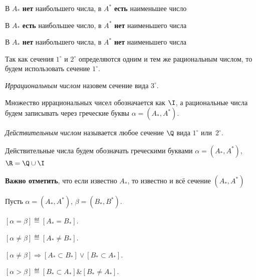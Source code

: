 \begin{properties}
\item В \(A_*\) \textbf{нет} наибольшего числа, в \(A^*\) \textbf{есть} наименьшее число
\item В \(A_*\) \textbf{есть} наибольшее число, в \(A^*\) \textbf{нет} наименьшего числа
\item В \(A_*\) \textbf{нет} наибольшего числа, в \(A^*\) \textbf{нет} наименьшего числа
\end{properties}

Так как сечения \(1^\circ\) и \(2^\circ\) определяются одним и тем же рациональным числом, то будем
использовать сечение \(1^\circ\).

\begin{definition}
\textit{Иррациональным числом} назовем сечение вида \(3^\circ\).
\end{definition}

Множество иррациональных чисел обозначается как \(\I\), а рациональные числа будем записывать через
греческие буквы \(\alpha = \left(A_*, A^*\right)\).

\begin{definition}
\textit{Действительным числом} называется любое сечение \(\Q\) вида \(1^\circ\) или~\(2^\circ\).
\end{definition}

Действительные числа будем обозначать греческими буквами \(\alpha =
\left(A_*, A^*\right)\), \(\R = \Q \cup \I\)

\textbf{Важно отметить}, что если известно \(A_*\), то известно и всё сечение
\(\left(A_*, A^*\right)\)

Пусть \(\alpha = \left(A_*, A^*\right)\), \(\beta = \left(B_*, B^*\right)\).

\begin{definition}
\(\left[\alpha = \beta\right] \eqdef \left[A_* = B_*\right].\)
\end{definition}

\begin{definition}
\(\left[\alpha \not = \beta\right] \eqdef \left[A_* \not = B_*\right].\)
\end{definition}

\begin{proposition}
\(\left[\alpha \not = \beta\right] \Rightarrow \left[A_* \subset B_*\right] \lor \left[B_* \subset
    A_*\right].\)
\end{proposition}

\begin{definition}
\(\left[\alpha > \beta\right] \eqdef \left[B_* \subset A_*\right] \& \left[B_* \not = A_*\right].\)
\end{definition}
